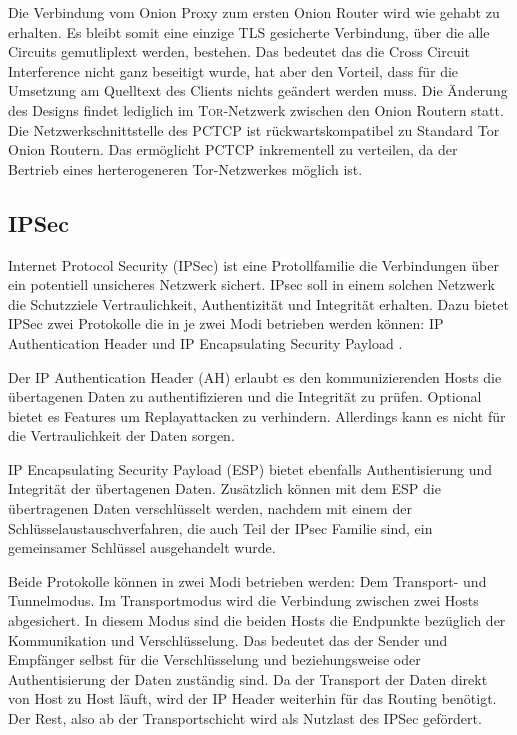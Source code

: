 \documentclass[fleqn,envcountsame,runningheads,10pt,a4paper]{llncs}
\begin{document}
Die Verbindung vom Onion Proxy zum ersten Onion Router wird wie gehabt zu erhalten. Es bleibt somit eine einzige TLS gesicherte Verbindung, über die alle Circuits gemutliplext werden, bestehen. Das bedeutet das die Cross Circuit Interference nicht ganz beseitigt wurde, hat aber den Vorteil, dass für die Umsetzung am Quelltext des Clients nichts geändert werden muss. Die Änderung des Designs findet lediglich im \textsc{Tor}-Netzwerk zwischen den Onion Routern statt. Die Netzwerkschnittstelle des PCTCP ist rückwartskompatibel zu Standard Tor Onion Routern. Das ermöglicht PCTCP inkrementell zu verteilen, da der Bertrieb eines herterogeneren Tor-Netzwerkes möglich ist.

\subsection{IPSec}

Internet Protocol Security (IPSec) ist eine Protollfamilie die Verbindungen über ein potentiell unsicheres Netzwerk sichert. IPsec soll in einem solchen Netzwerk die Schutzziele Vertraulichkeit, Authentizität und Integrität erhalten. Dazu bietet IPSec zwei Protokolle die in je zwei Modi betrieben werden können: IP Authentication Header \cite{rfc:ah} und IP Encapsulating Security Payload \cite{rfc:esp}.

Der IP Authentication Header (AH) erlaubt es den kommunizierenden Hosts die übertagenen Daten zu authentifizieren und die Integrität zu prüfen. Optional bietet es Features um Replayattacken zu verhindern. Allerdings kann es nicht für die Vertraulichkeit der Daten sorgen.

IP Encapsulating Security Payload (ESP) bietet ebenfalls Authentisierung und Integrität der übertagenen Daten. Zusätzlich können mit dem ESP die übertragenen Daten verschlüsselt werden, nachdem mit einem der Schlüsselaustauschverfahren, die auch Teil der IPsec Familie sind, ein gemeinsamer Schlüssel ausgehandelt wurde. 

Beide Protokolle können in zwei Modi betrieben werden: Dem Transport- und Tunnelmodus. Im Transportmodus wird die Verbindung zwischen zwei Hosts abgesichert. In diesem Modus sind die beiden Hosts die Endpunkte bezüglich der Kommunikation und Verschlüsselung. Das bedeutet das der Sender und Empfänger selbst für die Verschlüsselung und beziehungsweise oder Authentisierung der Daten zuständig sind. Da der Transport der Daten direkt von Host zu Host läuft, wird der IP Header weiterhin für das Routing benötigt. Der Rest, also ab der Transportschicht wird als Nutzlast des IPSec gefördert.
\end{document}

